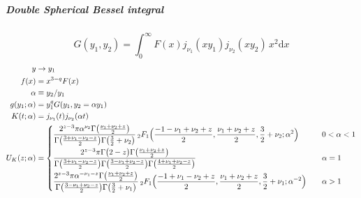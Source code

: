 \documentclass{article}
\renewcommand{\d}{\mathrm{d}}
\newcommand{\Mellin}{U}
\begin{document}
\subparagraph{Double Spherical Bessel integral}
\begin{equation}
    G(y_1, y_2) = \int_0^\infty F(x) j_{\nu_1}(xy_1) j_{\nu_2}(xy_2) \,x^2\d x
\end{equation}
\begin{align}
    y &\to y_1 \\
    f(x) &= x^{3-q} F(x) \\
    \alpha &\equiv y_2/y_1 \\
    g(y_1; \alpha) &= y_1^q G(y_1, y_2 = \alpha y_1) \\
    K(t; \alpha) &= j_{\nu_1}(t) j_{\nu_2}(\alpha t) \\
    \Mellin_K(z; \alpha) &=
    \begin{cases}
        \displaystyle
        \frac{2^{z-3} \pi \alpha^{\nu_2} \Gamma\bigl(\frac{\nu_1+\nu_2+z}2\bigr)}
            {\Gamma\bigl(\frac{3+\nu_1-\nu_2-z}2\bigr) \Gamma\bigl(\frac32+\nu_2\bigr)}
        \,_2F_1\Bigl( \frac{-1-\nu_1+\nu_2+z}2, \frac{\nu_1+\nu_2+z}2, \frac32+\nu_2; \alpha^2 \Bigr)
        & \quad 0<\alpha<1 \\[1em]
        \displaystyle
        \frac{2^{z-3} \pi \Gamma\bigl(2-z\bigr) \Gamma\bigl(\frac{\nu_1+\nu_2+z}2\bigr)}
            {\Gamma\bigl(\frac{3+\nu_1-\nu_2-z}2\bigr) \Gamma\bigl(\frac{3-\nu_1+\nu_2-z}2\bigr)
                \Gamma\bigl(\frac{4+\nu_1+\nu_2-z}2\bigr)}
        & \quad \alpha=1 \\[1em]
        \displaystyle
        \frac{2^{z-3} \pi \alpha^{-\nu_1-z} \Gamma\bigl(\frac{\nu_1+\nu_2+z}2\bigr)}
            {\Gamma\bigl(\frac{3-\nu_1+\nu_2-z}2\bigr) \Gamma\bigl(\frac32+\nu_1\bigr)}
        \,_2F_1\Bigl( \frac{-1+\nu_1-\nu_2+z}2, \frac{\nu_1+\nu_2+z}2, \frac32+\nu_1; \alpha^{-2} \Bigr)
        & \quad \alpha>1
    \end{cases}
\end{align}
\end{document}
